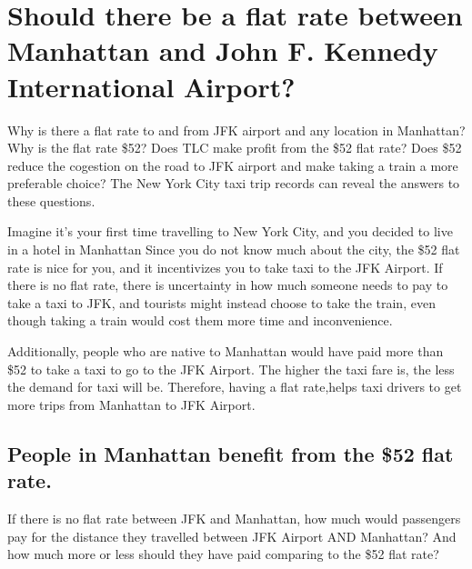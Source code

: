 \documentclass[12pt,twoside]{reedthesis}
\theoremstyle{definition}
\theoremstyle{definition}
\theoremstyle{definition}
\theoremstyle{remark}
\begin{document}
\section{Should there be a flat rate between Manhattan and John F.
Kennedy International
Airport?}\label{should-there-be-a-flat-rate-between-manhattan-and-john-f.-kennedy-international-airport}

Why is there a flat rate to and from JFK airport and any location in
Manhattan? Why is the flat rate \$52? Does TLC make profit from the \$52
flat rate? Does \$52 reduce the cogestion on the road to JFK airport and
make taking a train a more preferable choice? The New York City taxi
trip records can reveal the answers to these questions.

Imagine it's your first time travelling to New York City, and you
decided to live in a hotel in Manhattan Since you do not know much about
the city, the \$52 flat rate is nice for you, and it incentivizes you to
take taxi to the JFK Airport. If there is no flat rate, there is
uncertainty in how much someone needs to pay to take a taxi to JFK, and
tourists might instead choose to take the train, even though taking a
train would cost them more time and inconvenience.

Additionally, people who are native to Manhattan would have paid more
than \$52 to take a taxi to go to the JFK Airport. The higher the taxi
fare is, the less the demand for taxi will be. Therefore, having a flat
rate,helps taxi drivers to get more trips from Manhattan to JFK Airport.

\subsection{People in Manhattan benefit from the \$52 flat
rate.}\label{people-in-manhattan-benefit-from-the-52-flat-rate.}

If there is no flat rate between JFK and Manhattan, how much would
passengers pay for the distance they travelled between JFK Airport AND
Manhattan? And how much more or less should they have paid comparing to
the \$52 flat rate?
\end{document}
